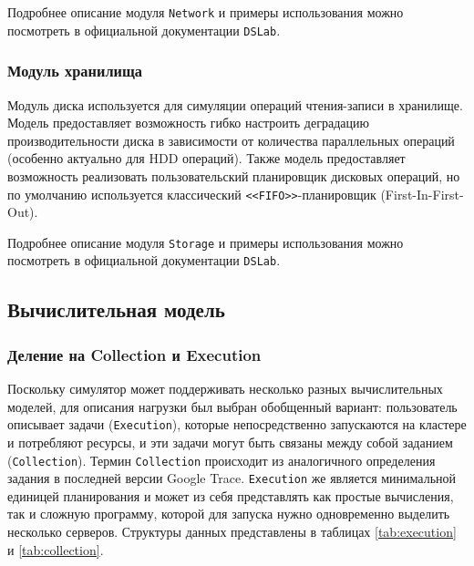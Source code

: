 Подробнее описание модуля \texttt{Network} и примеры использования можно посмотреть в официальной документации \texttt{DSLab}\cite{dslab-network-docs}.

\subsubsection{Модуль хранилища}

Модуль диска используется для симуляции операций чтения-записи в хранилище. Модель предоставляет возможность гибко настроить деградацию производительности диска в зависимости от количества параллельных операций (особенно актуально для HDD операций). Также модель предоставляет возможность реализовать пользовательский планировщик дисковых операций, но по умолчанию используется классический \texttt{<<FIFO>>}-планировщик (First-In-First-Out).  

Подробнее описание модуля \texttt{Storage} и примеры использования можно посмотреть в официальной документации \texttt{DSLab}\cite{dslab-storage-docs}.




\subsection{Вычислительная модель}\label{compute-model}

\subsubsection{Деление на Collection и Execution}\label{sec:execution-collection-model}

Поскольку симулятор может поддерживать несколько разных вычислительных моделей, для описания нагрузки был выбран обобщенный вариант: пользователь описывает задачи (\texttt{Execution}), которые непосредственно запускаются на кластере и потребляют ресурсы, и эти задачи могут быть связаны между собой заданием (\texttt{Collection}). Термин \texttt{Collection} происходит из аналогичного определения задания в последней версии Google Trace\cite{google-clusterdata}. \texttt{Execution} же является минимальной единицей планирования и может из себя представлять как простые вычисления, так и сложную программу, которой для запуска нужно одновременно выделить несколько серверов. Структуры данных представлены в таблицах \ref{tab:execution} и \ref{tab:collection}.

